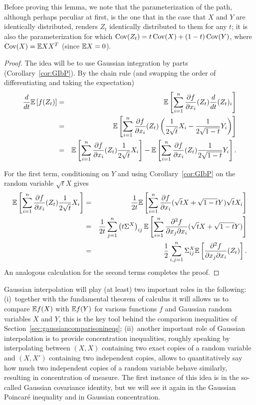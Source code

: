Before proving this lemma, we note that the parameterization of the path, although perhaps peculiar at first, is the one that in the case that $X$ and $Y$ are identically distributed, renders $Z_t$ identically distributed to them for any $t$; it is also the parameterization for which $\operatorname{Cov}(Z_t) = t\operatorname{Cov}(X)+(1-t)\operatorname{Cov}(Y)$, where $\operatorname{Cov}(X)=\mathbb{E} XX^T$ (since $\mathbb{E} X=0$).

\begin{proof} The idea will be to use Gaussian integration by parts (Corollary~\ref{cor:GIbP}). By the chain rule (and swapping the order of differentiating and taking the expectation) 
\begin{eqnarray}
\frac{d}{dt} \mathbb{E} \left[ f(Z_t) \right]& = &  \mathbb{E} \left[ \sum_{i=1}^n\frac{\partial f}{\partial x_i}(Z_t)\frac{d}{dt}(Z_t)_i\right] \nonumber \\ &= &  \mathbb{E} \left[ \sum_{i=1}^n\frac{\partial f}{\partial x_i}(Z_t)\left(\frac1{2\sqrt{t}}X_i-\frac1{2\sqrt{1-t}}Y_i\right)\right]  \\ &= &  \mathbb{E} \left[ \sum_{i=1}^n\frac{\partial f}{\partial x_i}(Z_t)\frac1{2\sqrt{t}}X_i\right]-\mathbb{E} \left[ \sum_{i=1}^n\frac{\partial f}{\partial x_i}(Z_t)\frac1{2\sqrt{1-t}}Y_i\right]. 
\end{eqnarray}



For the first term, conditioning on $Y$ and using Corollary~\ref{cor:GIbP} on the random variable $\sqrt{t}X$ gives
\begin{eqnarray*}
\mathbb{E} \left[ \sum_{i=1}^n\frac{\partial f}{\partial x_i}(Z_t)\frac1{2\sqrt{t}}X_i\right] & = & \frac1{2t}\mathbb{E} \left[ \sum_{i=1}^n\frac{\partial f}{\partial x_i}(\sqrt{t}X + \sqrt{1-t}Y)\sqrt{t}X_i\right] \\ & = & \frac1{2t} \sum_{j=1}^n \left( t\Sigma^{X}\right)_{ij} \mathbb{E} \left[ \sum_{i=1}^n\frac{\partial^2 f}{\partial x_j \partial x_i }(\sqrt{t}X + \sqrt{1-t}Y)\right]\\ & = & \frac1{2} \sum_{i,j=1}^n \Sigma^{X}_{ij} \mathbb{E} \left[ \frac{\partial^2 f}{\partial x_j \partial x_i }(Z_t)\right].
\end{eqnarray*}
An analogous calculation for the second terms completes the proof.
\end{proof}

Gaussian interpolation will play (at least) two important roles in the following: (i)~together with the fundamental theorem of calculus it will allows us to compare $\mathbb{E} f(X)$ with $\mathbb{E} f(Y)$ for various functions $f$ and Gaussian random variables $X$ and $Y$, this is the key tool behind the comparison inequalities of Section~\ref{sec:gaussiancomparisonineqs}; (ii)~another important role of Gaussian interpolation is to provide concentration inequalities, roughly speaking by interpolating between $(X,X)$ containing two exact copies of a random variable and $(X,X')$ containing two independent copies, allows to quantitatively say how much two independent copies of a random variable behave similarly, resulting in concentration of measure. The first instance of this idea is in the so-called Gaussian covariance identity, but we will see it again in the Gaussian Poincar\'{e} inequality and in Gaussian concentration.

